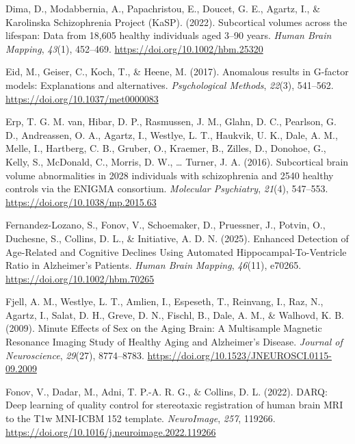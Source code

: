 \documentclass[
]{article}
\newlength{\cslhangindent}
\newenvironment{CSLReferences}[2] %
 {\begin{list}{}{%
  \setlength{\itemindent}{0pt}
  \setlength{\leftmargin}{0pt}
  \setlength{\parsep}{0pt}
  \ifodd #1
   \setlength{\leftmargin}{\cslhangindent}
   \setlength{\itemindent}{-1\cslhangindent}
  \fi
  \setlength{\itemsep}{#2\baselineskip}}}
 {\end{list}}
\begin{document}
\begin{CSLReferences}{1}{0}
Dima, D., Modabbernia, A., Papachristou, E., Doucet, G. E., Agartz, I.,
\& Karolinska Schizophrenia Project (KaSP). (2022). Subcortical volumes
across the lifespan: {Data} from 18,605 healthy individuals aged 3--90
years. \emph{Human Brain Mapping}, \emph{43}(1), 452--469.
\url{https://doi.org/10.1002/hbm.25320}

Eid, M., Geiser, C., Koch, T., \& Heene, M. (2017). Anomalous results in
{G}-factor models: {Explanations} and alternatives. \emph{Psychological
Methods}, \emph{22}(3), 541--562.
\url{https://doi.org/10.1037/met0000083}

Erp, T. G. M. van, Hibar, D. P., Rasmussen, J. M., Glahn, D. C.,
Pearlson, G. D., Andreassen, O. A., Agartz, I., Westlye, L. T., Haukvik,
U. K., Dale, A. M., Melle, I., Hartberg, C. B., Gruber, O., Kraemer, B.,
Zilles, D., Donohoe, G., Kelly, S., McDonald, C., Morris, D. W.,
\ldots{} Turner, J. A. (2016). Subcortical brain volume abnormalities in
2028 individuals with schizophrenia and 2540 healthy controls via the
{ENIGMA} consortium. \emph{Molecular Psychiatry}, \emph{21}(4),
547--553. \url{https://doi.org/10.1038/mp.2015.63}

Fernandez-Lozano, S., Fonov, V., Schoemaker, D., Pruessner, J., Potvin,
O., Duchesne, S., Collins, D. L., \& Initiative, A. D. N. (2025).
Enhanced {Detection} of {Age}-{Related} and {Cognitive} {Declines}
{Using} {Automated} {Hippocampal}-{To}-{Ventricle} {Ratio} in
{Alzheimer}'s {Patients}. \emph{Human Brain Mapping}, \emph{46}(11),
e70265. \url{https://doi.org/10.1002/hbm.70265}

Fjell, A. M., Westlye, L. T., Amlien, I., Espeseth, T., Reinvang, I.,
Raz, N., Agartz, I., Salat, D. H., Greve, D. N., Fischl, B., Dale, A.
M., \& Walhovd, K. B. (2009). Minute {Effects} of {Sex} on the {Aging}
{Brain}: {A} {Multisample} {Magnetic} {Resonance} {Imaging} {Study} of
{Healthy} {Aging} and {Alzheimer}'s {Disease}. \emph{Journal of
Neuroscience}, \emph{29}(27), 8774--8783.
\url{https://doi.org/10.1523/JNEUROSCI.0115-09.2009}

Fonov, V., Dadar, M., Adni, T. P.-A. R. G., \& Collins, D. L. (2022).
{DARQ}: {Deep} learning of quality control for stereotaxic registration
of human brain {MRI} to the {T1w} {MNI}-{ICBM} 152 template.
\emph{NeuroImage}, \emph{257}, 119266.
\url{https://doi.org/10.1016/j.neuroimage.2022.119266}


\end{CSLReferences}
\end{document}
